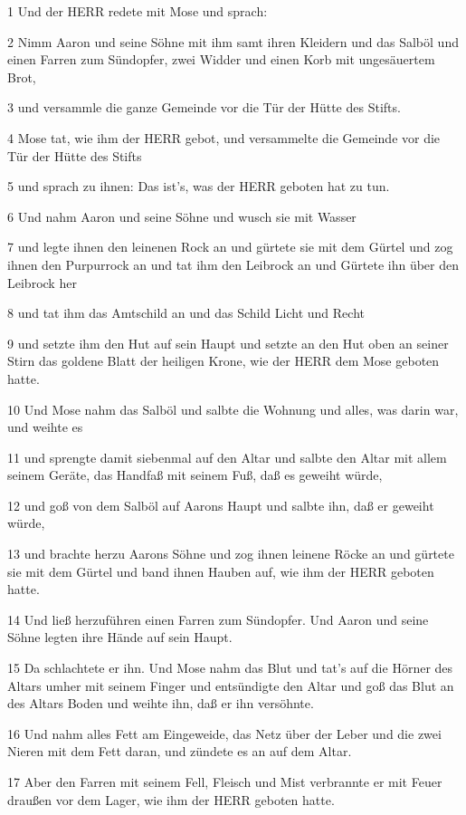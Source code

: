 \par 1 Und der HERR redete mit Mose und sprach:
\par 2 Nimm Aaron und seine Söhne mit ihm samt ihren Kleidern und das Salböl und einen Farren zum Sündopfer, zwei Widder und einen Korb mit ungesäuertem Brot,
\par 3 und versammle die ganze Gemeinde vor die Tür der Hütte des Stifts.
\par 4 Mose tat, wie ihm der HERR gebot, und versammelte die Gemeinde vor die Tür der Hütte des Stifts
\par 5 und sprach zu ihnen: Das ist's, was der HERR geboten hat zu tun.
\par 6 Und nahm Aaron und seine Söhne und wusch sie mit Wasser
\par 7 und legte ihnen den leinenen Rock an und gürtete sie mit dem Gürtel und zog ihnen den Purpurrock an und tat ihm den Leibrock an und Gürtete ihn über den Leibrock her
\par 8 und tat ihm das Amtschild an und das Schild Licht und Recht
\par 9 und setzte ihm den Hut auf sein Haupt und setzte an den Hut oben an seiner Stirn das goldene Blatt der heiligen Krone, wie der HERR dem Mose geboten hatte.
\par 10 Und Mose nahm das Salböl und salbte die Wohnung und alles, was darin war, und weihte es
\par 11 und sprengte damit siebenmal auf den Altar und salbte den Altar mit allem seinem Geräte, das Handfaß mit seinem Fuß, daß es geweiht würde,
\par 12 und goß von dem Salböl auf Aarons Haupt und salbte ihn, daß er geweiht würde,
\par 13 und brachte herzu Aarons Söhne und zog ihnen leinene Röcke an und gürtete sie mit dem Gürtel und band ihnen Hauben auf, wie ihm der HERR geboten hatte.
\par 14 Und ließ herzuführen einen Farren zum Sündopfer. Und Aaron und seine Söhne legten ihre Hände auf sein Haupt.
\par 15 Da schlachtete er ihn. Und Mose nahm das Blut und tat's auf die Hörner des Altars umher mit seinem Finger und entsündigte den Altar und goß das Blut an des Altars Boden und weihte ihn, daß er ihn versöhnte.
\par 16 Und nahm alles Fett am Eingeweide, das Netz über der Leber und die zwei Nieren mit dem Fett daran, und zündete es an auf dem Altar.
\par 17 Aber den Farren mit seinem Fell, Fleisch und Mist verbrannte er mit Feuer draußen vor dem Lager, wie ihm der HERR geboten hatte.
